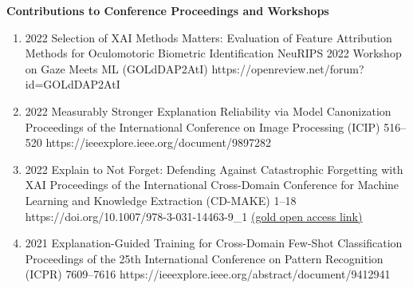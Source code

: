 \documentclass[10pt,a4paper]{article} %
\begin{document}
\headedsection %
{\bf Contributions to Conference Proceedings and Workshops}{}
{
    \begin{enumerate}

        \item {}
                        {2022}
                        {Selection of XAI Methods Matters: Evaluation of Feature Attribution Methods for Oculomotoric Biometric Identification}
                        {NeuRIPS 2022 Workshop on Gaze Meets ML}
                        {(GOLdDAP2AtI)}
                        {https://openreview.net/forum?id=GOLdDAP2AtI}


        \item {}
                            {2022}
                            {Measurably Stronger Explanation Reliability via Model Canonization}
                            {Proceedings of the International Conference on Image Processing (ICIP)}
                            {516--520}
                            {https://ieeexplore.ieee.org/document/9897282}

        \item {}
                            {2022}
                            {Explain to Not Forget: Defending Against Catastrophic Forgetting with XAI}
                            {Proceedings of the International Cross-Domain Conference for Machine Learning and Knowledge Extraction (CD-MAKE)}
                            {1--18}
                            {https://doi.org/10.1007/978-3-031-14463-9_1}
                            {\href{https://link.springer.com/content/pdf/10.1007/978-3-031-04083-2.pdf}{(gold open access link)}} %

        \item {}
                                {2021}
                                {Explanation-Guided Training for Cross-Domain Few-Shot Classification}
                                {Proceedings of the 25th International Conference on Pattern Recognition (ICPR)}
                                {7609--7616}
                                {https://ieeexplore.ieee.org/abstract/document/9412941}


\end{enumerate}}
\end{document}
